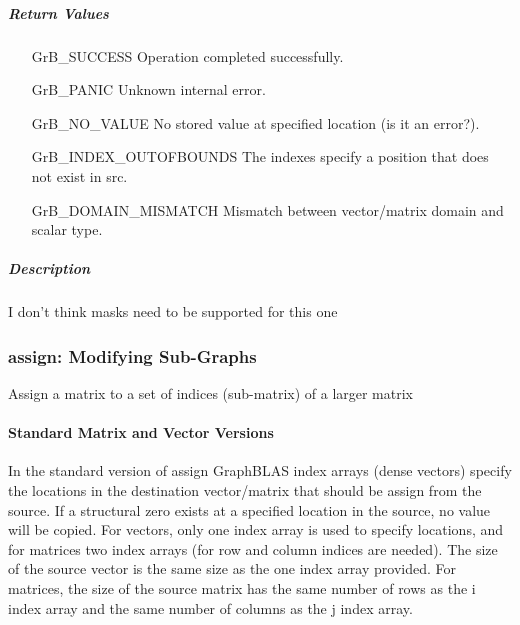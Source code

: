 \subparagraph{Return Values}

\begin{itemize}[leftmargin=2.1in]
\item[{\sf GrB\_SUCCESS}] 	          Operation completed successfully.
\item[{\sf GrB\_PANIC}]	              Unknown internal error.
\item[{\sf GrB\_NO\_VALUE}]           No stored value at specified location (is it an error?).
\item[{\sf GrB\_INDEX\_OUTOFBOUNDS}]  The indexes specify a position that does not exist in src.
\item[{\sf GrB\_DOMAIN\_MISMATCH}]    Mismatch between vector/matrix domain and scalar type.
\end{itemize}

\subparagraph{Description}

{\scott I don't think masks need to be supported for this one}



\subsubsection{{\sf assign}: Modifying Sub-Graphs}

Assign a matrix to a set of indices (sub-matrix) of a larger matrix


\paragraph{Standard Matrix and Vector Versions}

In the standard version of {\sf assign} GraphBLAS index arrays (dense vectors)
specify the locations in the destination vector/matrix that should be assign from
the source.  If a structural zero exists at a specified location in the source,
no value will be copied.  For vectors, only one index array is used to specify
locations, and for matrices two index arrays (for row and column indices are needed).
The size of the source vector is the same size as the one index array provided.
For matrices, the size of the source matrix has the same number of rows as the
{\sf i} index array and the same number of columns as the {\sf j} index array.

